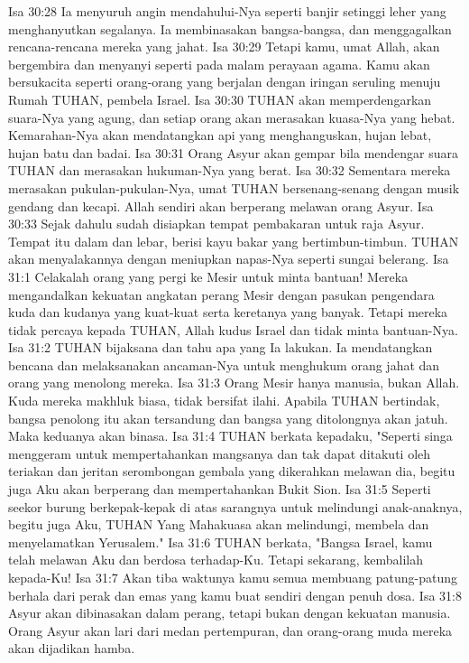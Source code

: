 Isa 30:28  Ia menyuruh angin mendahului-Nya seperti banjir setinggi leher yang menghanyutkan segalanya. Ia membinasakan bangsa-bangsa, dan menggagalkan rencana-rencana mereka yang jahat.
Isa 30:29  Tetapi kamu, umat Allah, akan bergembira dan menyanyi seperti pada malam perayaan agama. Kamu akan bersukacita seperti orang-orang yang berjalan dengan iringan seruling menuju Rumah TUHAN, pembela Israel.
Isa 30:30  TUHAN akan memperdengarkan suara-Nya yang agung, dan setiap orang akan merasakan kuasa-Nya yang hebat. Kemarahan-Nya akan mendatangkan api yang menghanguskan, hujan lebat, hujan batu dan badai.
Isa 30:31  Orang Asyur akan gempar bila mendengar suara TUHAN dan merasakan hukuman-Nya yang berat.
Isa 30:32  Sementara mereka merasakan pukulan-pukulan-Nya, umat TUHAN bersenang-senang dengan musik gendang dan kecapi. Allah sendiri akan berperang melawan orang Asyur.
Isa 30:33  Sejak dahulu sudah disiapkan tempat pembakaran untuk raja Asyur. Tempat itu dalam dan lebar, berisi kayu bakar yang bertimbun-timbun. TUHAN akan menyalakannya dengan meniupkan napas-Nya seperti sungai belerang.
Isa 31:1  Celakalah orang yang pergi ke Mesir untuk minta bantuan! Mereka mengandalkan kekuatan angkatan perang Mesir dengan pasukan pengendara kuda dan kudanya yang kuat-kuat serta keretanya yang banyak. Tetapi mereka tidak percaya kepada TUHAN, Allah kudus Israel dan tidak minta bantuan-Nya.
Isa 31:2  TUHAN bijaksana dan tahu apa yang Ia lakukan. Ia mendatangkan bencana dan melaksanakan ancaman-Nya untuk menghukum orang jahat dan orang yang menolong mereka.
Isa 31:3  Orang Mesir hanya manusia, bukan Allah. Kuda mereka makhluk biasa, tidak bersifat ilahi. Apabila TUHAN bertindak, bangsa penolong itu akan tersandung dan bangsa yang ditolongnya akan jatuh. Maka keduanya akan binasa.
Isa 31:4  TUHAN berkata kepadaku, "Seperti singa menggeram untuk mempertahankan mangsanya dan tak dapat ditakuti oleh teriakan dan jeritan serombongan gembala yang dikerahkan melawan dia, begitu juga Aku akan berperang dan mempertahankan Bukit Sion.
Isa 31:5  Seperti seekor burung berkepak-kepak di atas sarangnya untuk melindungi anak-anaknya, begitu juga Aku, TUHAN Yang Mahakuasa akan melindungi, membela dan menyelamatkan Yerusalem."
Isa 31:6  TUHAN berkata, "Bangsa Israel, kamu telah melawan Aku dan berdosa terhadap-Ku. Tetapi sekarang, kembalilah kepada-Ku!
Isa 31:7  Akan tiba waktunya kamu semua membuang patung-patung berhala dari perak dan emas yang kamu buat sendiri dengan penuh dosa.
Isa 31:8  Asyur akan dibinasakan dalam perang, tetapi bukan dengan kekuatan manusia. Orang Asyur akan lari dari medan pertempuran, dan orang-orang muda mereka akan dijadikan hamba.

